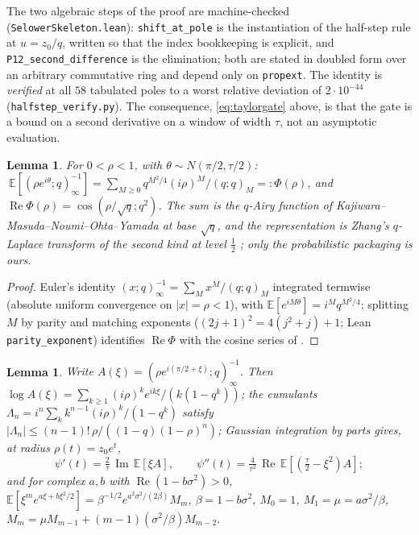 \documentclass[11pt]{article}
\theoremstyle{plain}
\newtheorem{lemma}[theorem]{Lemma}
\theoremstyle{definition}
\theoremstyle{remark}
\begin{document}
\noindent The two algebraic steps of the proof are machine-checked
(\texttt{SelowerSkeleton.lean}): \texttt{shift\_at\_pole} is the instantiation of the half-step rule
at $u=z_0/q$, written so that the index bookkeeping is explicit, and
\texttt{P12\_second\_difference} is the elimination; both are stated in doubled form over an
arbitrary commutative ring and depend only on \texttt{propext}. The identity is
\emph{verified} at all $58$ tabulated poles to a worst relative deviation of
$2\cdot10^{-44}$ (\texttt{halfstep\_verify.py}). The consequence, \eqref{eq:taylorgate} above, is that the gate is a bound on a second
derivative on a window of width $\tau$, not an asymptotic evaluation.



\begin{lemma}\label{app:rep2}
For $0<\rho<1$, with $\theta\sim N(\pi/2,\tau/2)$:
$\ \mathbb{E}[(\rho e^{i\theta};q)_\infty^{-1}]=\sum_{M\ge0}q^{M^2/4}(i\rho)^M/(q;q)_M=:\Phi(\rho)$, and
$\operatorname{Re}\Phi(\rho)=\cos(\rho/\sqrt q;q^2)$. The sum is the $q$-Airy function of
Kajiwara--Masuda--Noumi--Ohta--Yamada \cite{KMNOY2004} at base $\sqrt q$, and the representation is Zhang's
$q$-Laplace transform of the second kind at level $\tfrac12$ \cite{Zhang2000}; only the
probabilistic packaging is ours.
\end{lemma}

\begin{proof}
Euler's identity $(x;q)_\infty^{-1}=\sum_Mx^M/(q;q)_M$ integrated termwise (absolute uniform
convergence on $|x|=\rho<1$), with $\mathbb{E}[e^{iM\theta}]=i^Mq^{M^2/4}$; splitting $M$ by parity and matching exponents
($(2j+1)^2=4(j^2+j)+1$; Lean \texttt{parity\_exponent}) identifies $\operatorname{Re}\Phi$ with the
cosine series of {\cite[Proposition \textup{prop:qtrig}]{Bonfioli2026bA}}.
\end{proof}

\begin{lemma}\label{app:cum}
Write $A(\xi)=(\rho e^{i(\pi/2+\xi)};q)_\infty^{-1}$. Then
$\log A(\xi)=\sum_{k\ge1}(i\rho)^ke^{ik\xi}/(k(1-q^k))$; the cumulants
$\Lambda_n=i^n\sum_kk^{n-1}(i\rho)^k/(1-q^k)$ satisfy
$|\Lambda_n|\le(n-1)!\,\rho/((1-q)(1-\rho)^n)$; Gaussian integration by parts gives, at radius
$\rho(t)=z_0e^{t}$,
\[
 \psi'(t)=\tfrac2\tau\,\operatorname{Im}\,\mathbb{E}[\xi A],\qquad
 \psi''(t)=\tfrac4{\tau^2}\,\operatorname{Re}\,\mathbb{E}[(\tfrac\tau2-\xi^2)A];
\]
and for complex $a,b$ with $\operatorname{Re}(1-b\sigma^2)>0$,
$\mathbb{E}[\xi^me^{a\xi+b\xi^2/2}]=\beta^{-1/2}e^{a^2\sigma^2/(2\beta)}M_m$, $\beta=1-b\sigma^2$,
$M_0=1$, $M_1=\mu=a\sigma^2/\beta$, $M_m=\mu M_{m-1}+(m-1)(\sigma^2/\beta)M_{m-2}$.
\end{lemma}
\end{document}
